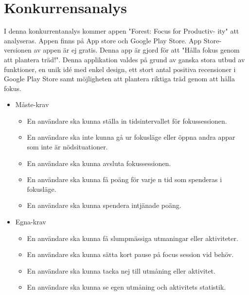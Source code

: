 \documentclass[11pt]{article}
\begin{document}
\section{Konkurrensanalys}
\label{sec:orgec9fb38}

I denna konkurrentanalys kommer appen "Forest: Focus for Productiv-
ity" att analyseras. Appen finns på App store och Google Play Store. App
Store-versionen av appen är ej gratis. Denna app är gjord för att "Hålla
fokus genom att plantera träd!".
Denna applikation valdes på grund av ganska stora utbud av funktioner,
en unik idé med enkel design, ett stort antal positiva recensioner i Google
Play Store samt möjligheten att plantera riktiga träd genom att hålla fokus.

\begin{itemize}
\item Måste-krav
\begin{itemize}
\item En användare ska kunna ställa in tidsintervallet för fokussessionen.
\item En användare ska inte kunna gå ur fokusläge eller öppna andra appar som inte är nödsituationer.
\item En användare ska kunna avsluta fokussessionen.
\item En användare ska kunna få poäng för varje n tid som spenderas i fokusläge.
\item En användare ska kunna spendera intjänade poäng.
\end{itemize}

\item Egna-krav
\begin{itemize}
\item En användare ska kunna få slumpmässiga utmaningar eller aktiviteter.
\item En användare ska kunna sätta kort pause på focus session vid behöv.
\item En användare ska kunna tacka nej till utmåning eller aktivitet.
\item En användare ska kunna se egen utmåning och aktivitets statistik.
\end{itemize}


\end{itemize}
\end{document}
